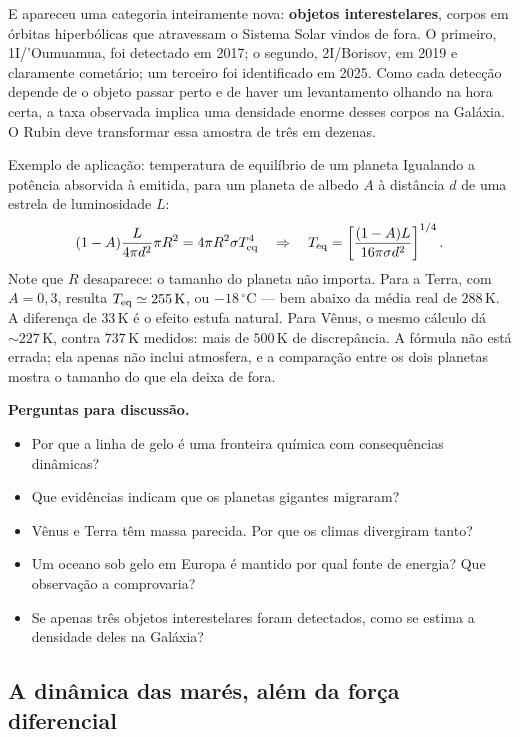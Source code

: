 \documentclass[11pt,a4paper]{article}
\begin{document}
E apareceu uma categoria inteiramente nova: \textbf{objetos interestelares}, corpos em órbitas hiperbólicas que atravessam o Sistema Solar vindos de fora. O primeiro, 1I/'Oumuamua, foi detectado em 2017; o segundo, 2I/Borisov, em 2019 e claramente cometário; um terceiro foi identificado em 2025. Como cada detecção depende de o objeto passar perto e de haver um levantamento olhando na hora certa, a taxa observada implica uma densidade enorme desses corpos na Galáxia. O Rubin deve transformar essa amostra de três em dezenas.

\begin{lessonblock}{Exemplo de aplicação: temperatura de equilíbrio de um planeta}
Igualando a potência absorvida à emitida, para um planeta de albedo $A$ à distância $d$ de uma estrela de luminosidade $L$:
\[
(1-A)\frac{L}{4\pi d^{2}}\pi R^{2}=4\pi R^{2}\sigma T_{\rm eq}^{4}
\quad\Rightarrow\quad
T_{\rm eq}=\left[\frac{(1-A)L}{16\pi\sigma d^{2}}\right]^{1/4}.
\]
Note que $R$ desaparece: o tamanho do planeta não importa. Para a Terra, com $A=0{,}3$, resulta $T_{\rm eq}\simeq255\,\mathrm{K}$, ou $-18\,^\circ\mathrm{C}$ --- bem abaixo da média real de $288\,\mathrm{K}$. A diferença de $33\,\mathrm{K}$ é o efeito estufa natural. Para Vênus, o mesmo cálculo dá $\sim227\,\mathrm{K}$, contra $737\,\mathrm{K}$ medidos: mais de $500\,\mathrm{K}$ de discrepância. A fórmula não está errada; ela apenas não inclui atmosfera, e a comparação entre os dois planetas mostra o tamanho do que ela deixa de fora.
\end{lessonblock}

\textbf{Perguntas para discussão.}
\begin{itemize}
\item Por que a linha de gelo é uma fronteira química com consequências dinâmicas?
\item Que evidências indicam que os planetas gigantes migraram?
\item Vênus e Terra têm massa parecida. Por que os climas divergiram tanto?
\item Um oceano sob gelo em Europa é mantido por qual fonte de energia? Que observação a comprovaria?
\item Se apenas três objetos interestelares foram detectados, como se estima a densidade deles na Galáxia?
\end{itemize}
\subsection*{A dinâmica das marés, além da força diferencial}
\end{document}
